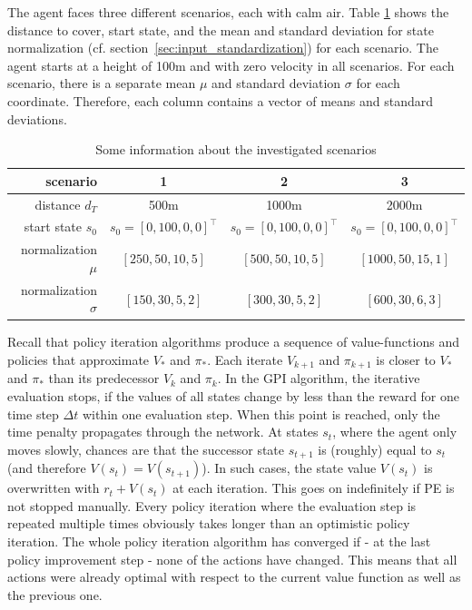 The agent faces three different scenarios, each with calm air. Table \ref{tab:scenario_data} shows the distance to cover, start state, and the mean and standard deviation for state normalization (cf. section~\ref{sec:input_standardization}) for each scenario. The agent starts at a height of 100m and with zero velocity in all scenarios. For each scenario, there is a separate mean $\mu$ and standard deviation $\sigma$ for each coordinate. Therefore, each column contains a vector of means and standard deviations.

\begin{table}[h]
	\begin{center}
		\begin{tabular}{r|c c c}
			scenario & 1 & 2 & 3 \\ \hline
			distance $d_T$ & 500m & 1000m & 2000m\\
			start state $s_0$ & $s_0 = [0, 100, 0, 0]^\top$ &  $s_0 = [0, 100, 0, 0]^\top$  &  $s_0 = [0, 100, 0, 0]^\top$  \\
			normalization $\mu$ & $[250, 50, 10, 5]$  &$[500, 50, 10, 5]$ & $[1000, 50, 15, 1]$ \\
			normalization $\sigma$ & $[150, 30, 5, 2]$ & $[300, 30, 5, 2]$ & $[600, 30, 6, 3]$
		\end{tabular}
		\caption{Some information about the investigated scenarios}
		\label{tab:scenario_data}
	\end{center}
\end{table}

Recall that policy iteration algorithms produce a sequence of value-functions and policies that approximate $V_*$ and $\pi_*$. Each iterate $V_{k+1}$ and $\pi_{k+1}$ is closer to $V_*$ and $\pi_*$ than its predecessor $V_k$ and $\pi_k$.
In the GPI algorithm, the iterative evaluation stops, if the values of all states change by less than the reward for one time step $\Delta t$ within one evaluation step. When this point is reached, only the time penalty propagates through the network. At states $s_t$, where the agent only moves slowly, chances are that the successor state $s_{t+1}$ is (roughly) equal to $s_t$ (and therefore $V(s_t)=V(s_{t+1})$). In such cases, the state value $V(s_t)$ is overwritten with $r_t + V(s_t)$ at each iteration. This goes on indefinitely if PE is not stopped manually. Every policy iteration where the evaluation step is repeated multiple times obviously takes longer than an optimistic policy iteration. The whole policy iteration algorithm has converged if - at the last policy improvement step - none of the actions have changed. This means that all actions were already optimal with respect to the current value function as well as the previous one. \smallbreak

